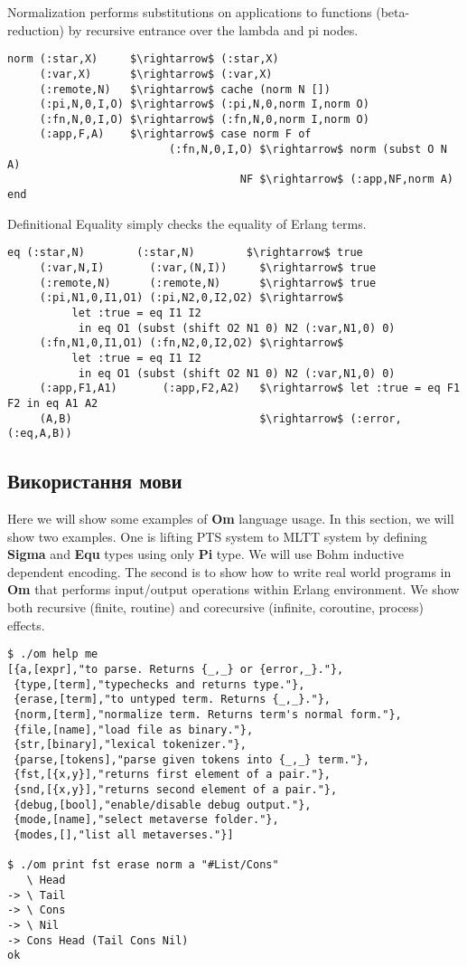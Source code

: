 Normalization performs substitutions on applications to functions (beta-reduction)
by recursive entrance over the lambda and pi nodes.

\begin{lstlisting}[mathescape=true]
norm (:star,X)     $\rightarrow$ (:star,X)
     (:var,X)      $\rightarrow$ (:var,X)
     (:remote,N)   $\rightarrow$ cache (norm N [])
     (:pi,N,0,I,O) $\rightarrow$ (:pi,N,0,norm I,norm O)
     (:fn,N,0,I,O) $\rightarrow$ (:fn,N,0,norm I,norm O)
     (:app,F,A)    $\rightarrow$ case norm F of
                         (:fn,N,0,I,O) $\rightarrow$ norm (subst O N A)
                                    NF $\rightarrow$ (:app,NF,norm A) end
\end{lstlisting}

Definitional Equality simply checks the equality of Erlang terms.

\begin{lstlisting}[mathescape=true]
  eq (:star,N)        (:star,N)        $\rightarrow$ true
     (:var,N,I)       (:var,(N,I))     $\rightarrow$ true
     (:remote,N)      (:remote,N)      $\rightarrow$ true
     (:pi,N1,0,I1,O1) (:pi,N2,0,I2,O2) $\rightarrow$
          let :true = eq I1 I2
           in eq O1 (subst (shift O2 N1 0) N2 (:var,N1,0) 0)
     (:fn,N1,0,I1,O1) (:fn,N2,0,I2,O2) $\rightarrow$
          let :true = eq I1 I2
           in eq O1 (subst (shift O2 N1 0) N2 (:var,N1,0) 0)
     (:app,F1,A1)       (:app,F2,A2)   $\rightarrow$ let :true = eq F1 F2 in eq A1 A2
     (A,B)                             $\rightarrow$ (:error,(:eq,A,B))
\end{lstlisting}

\subsection{Використання мови}
Here we will show some examples of {\bf Om} language usage.
In this section, we will show two examples.
One is lifting PTS system to MLTT system by defining {\bf Sigma} and {\bf Equ} types using only {\bf Pi} type.
We will use Bohm inductive dependent encoding\cite{Bohm85}.
The second is to show how to write real world programs in {\bf Om} that performs input/output operations within Erlang environment.
We show both recursive (finite, routine) and corecursive (infinite, coroutine, process) effects.

\begin{lstlisting}
$ ./om help me
[{a,[expr],"to parse. Returns {_,_} or {error,_}."},
 {type,[term],"typechecks and returns type."},
 {erase,[term],"to untyped term. Returns {_,_}."},
 {norm,[term],"normalize term. Returns term's normal form."},
 {file,[name],"load file as binary."},
 {str,[binary],"lexical tokenizer."},
 {parse,[tokens],"parse given tokens into {_,_} term."},
 {fst,[{x,y}],"returns first element of a pair."},
 {snd,[{x,y}],"returns second element of a pair."},
 {debug,[bool],"enable/disable debug output."},
 {mode,[name],"select metaverse folder."},
 {modes,[],"list all metaverses."}]

$ ./om print fst erase norm a "#List/Cons"
   \ Head
-> \ Tail
-> \ Cons
-> \ Nil
-> Cons Head (Tail Cons Nil)
ok
\end{lstlisting}

